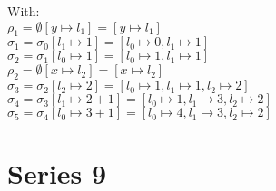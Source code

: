 \documentclass[12pt,fleqn]{article}		%
\begin{document}
With:\\
$ \rho_1 = \emptyset[y \mapsto l_1] = [y \mapsto l_1] $\\
$ \sigma_1 = \sigma_0[l_1 \mapsto 1] = [l_0 \mapsto 0, l_1 \mapsto 1] $\\
$ \sigma_2 = \sigma_1[l_0 \mapsto 1] = [l_0 \mapsto 1, l_1 \mapsto 1] $\\
$ \rho_2 = \emptyset[x \mapsto l_2] = [x \mapsto l_2] $\\
$ \sigma_3 = \sigma_2[l_2 \mapsto 2] = [l_0 \mapsto 1, l_1 \mapsto 1, l_2 \mapsto 2] $\\
$ \sigma_4 = \sigma_3[l_1 \mapsto 2 + 1] = [l_0 \mapsto 1, l_1 \mapsto 3, l_2 \mapsto 2] $\\
$ \sigma_5 = \sigma_4[l_0 \mapsto 3 + 1] = [l_0 \mapsto 4, l_1 \mapsto 3, l_2 \mapsto 2] $\\

\section{Series 9}
\end{document}
